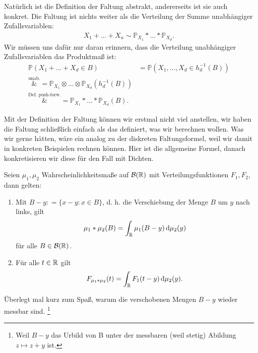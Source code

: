 \begin{bem1}
	Nat\"urlich ist die Definition der Faltung abstrakt, andererseits ist sie auch konkret. Die Faltung ist nichts weiter als die Verteilung der Summe unabh\"angiger Zufallsvariablen:
	\begin{align*}
		X_1+...+X_n\sim \mathbb{P}_{X_1} *...*\mathbb{P}_{X_d}.
	\end{align*}	
	Wir m\"ussen uns daf\"ur nur daran erinnern, dass die Verteilung unabh\"angiger Zufallsvariablen das Produktma\ss{} ist:
	\begin{align*}
		\mathbb{P}(X_1+...+X_d \in B) &= \mathbb{P}(X_1,...,X_d \in h_d^{-1}(B)) \\
		\overset{\text{unab.}}&{=} \mathbb{P}_{X_1} \otimes ... \otimes \mathbb{P}_{X_d}(h_d^{-1}(B))\\
		\overset{\text{Def. push-forw.}}&{=} \mathbb{P}_{X_1} *...*\mathbb{P}_{X_d}(B).
	\end{align*}
\end{bem1}
Mit der Definition der Faltung k\"onnen wir erstmal nicht viel anstellen, wir haben die Faltung schlie\ss lich einfach als das definiert, was wir berechnen wollen. Was wir gerne h\"atten, w\"are ein analog zu der diskreten Faltungsformel, weil wir damit in konkreten Beispielen rechnen k\"onnen. Hier ist die allgemeine Formel, danach konkretisieren wir diese f\"ur den Fall mit Dichten.
\begin{prop}\label{randomProp}
	Seien $\mu_1,\mu_2$ Wahrscheinlichkeitsmaße auf $\mathcal{B}(\mathbb{R})$ mit Verteilungsfunktionen $F_1,F_2$, dann gelten:
	\begin{enumerate}[label=(\roman*)]
		\item Mit $B-y: = \{ x-y\colon x \in B \}$, d. h. die Verschiebung der Menge $B$ um $y$ nach links, gilt \[ \mu_1 * \mu_2(B) = \int_{\mathbb{R}} \mu_1(B-y) \, \mathrm{d} \mu_2(y)\] f\"ur alle $B\in \mathcal B(\mathbb{R})$.
		\item F\"ur alle $t\in \mathbb{R}$ gilt \[ F_{\mu_1 * \mu_2}(t) = \int_{\mathbb{R}} F_1(t-y) \, \mathrm{d} \mu_2(y).\]
	\end{enumerate}
\end{prop}
\"Uberlegt mal kurz zum Spa\ss{}, warum die verschobenen Mengen $B-y$ wieder messbar sind. \footnote{Weil $B-y$ das Urbild von B unter der messbaren (weil stetig) Abildung $z\mapsto z+y$ ist.}
